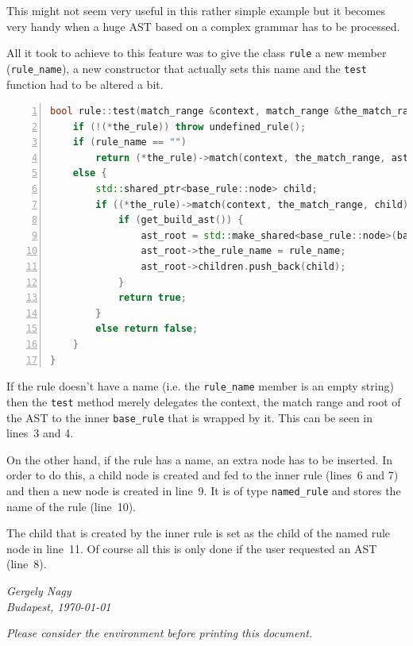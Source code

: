 \documentclass[12pt]{article}
\begin{document}
This might not seem very useful in this rather simple example but it becomes very handy when a huge AST based
on a complex grammar has to be processed.

All it took to achieve to this feature was to give the class \texttt{rule} a new member (\texttt{rule\_name}),
a new constructor that actually sets this name and the \texttt{test} function had to be altered a bit.

\begin{center}
	\begin{minipage}[ht]{0.9\textwidth}
		\begin{lstlisting}[language=C++, breaklines=true, numbers=left]
bool rule::test(match_range &context, match_range &the_match_range, std::shared_ptr<base_rule::node> &ast_root) {
	if (!(*the_rule)) throw undefined_rule();
	if (rule_name == "")
		return (*the_rule)->match(context, the_match_range, ast_root);
	else {
		std::shared_ptr<base_rule::node> child;
		if ((*the_rule)->match(context, the_match_range, child)) {
			if (get_build_ast()) {
				ast_root = std::make_shared<base_rule::node>(base_rule::node::type::named_rule);
				ast_root->the_rule_name = rule_name;
				ast_root->children.push_back(child);
			}
			return true;
		}
		else return false;
	}
}
		\end{lstlisting}
	\end{minipage}
\end{center}

If the rule doesn't have a name (i.e. the \texttt{rule\_name} member is an empty string) then the
\texttt{test} method merely delegates the context, the match range and root of the AST to the inner
\texttt{base\_rule} that is wrapped by it. This can be seen in lines~3 and 4. 

On the other hand, if the rule has a name, an extra node has to be inserted. In order to do this, a child node
is created and fed to the inner rule (lines~6 and 7) and then a new node is created in line~9. It is of type
\texttt{named\_rule} and stores the name of the rule (line~10).

The child that is created by the inner rule is set as the child of the named rule node in line~11. Of course
all this is only done if the user requested an AST (line~8).

\vfill
\vfill
\vfill
\hfill\begin{minipage}[h]{0.3\textwidth}
\begin{center}
	\textit{Gergely Nagy}\\
	\textit{Budapest, \today}
\end{center}
\end{minipage}
\vfill

\newpage \tableofcontents

\vfill
\vfill
\begin{center}
\footnotesize\emph{Please consider the environment before printing this document.}
\end{center}
\vfill
\end{document}
